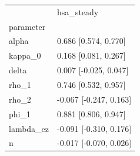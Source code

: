 \begin{tabular}{ll}
\toprule
 & hsa\_steady \\
parameter &  \\
\midrule
alpha & 0.686 [0.574, 0.770] \\
kappa\_0 & 0.168 [0.081, 0.267] \\
delta & 0.007 [-0.025, 0.047] \\
rho\_1 & 0.746 [0.532, 0.957] \\
rho\_2 & -0.067 [-0.247, 0.163] \\
phi\_1 & 0.881 [0.806, 0.947] \\
lambda\_ez & -0.091 [-0.310, 0.176] \\
n & -0.017 [-0.070, 0.026] \\
\bottomrule
\end{tabular}
